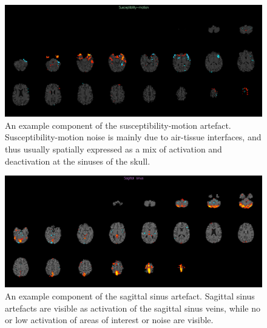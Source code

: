 \begin{figure}[H]                 
	\includegraphics[width=.85\textwidth]{figures/bMethods/Susceptibility_motion}  
	\caption{An example component of the susceptibility-motion artefact. Susceptibility-motion noise is mainly due to air-tissue interfaces, and thus usually spatially expressed as a mix of activation and deactivation at the sinuses of the skull.}
	\label{fig:meth:sus} 
\end{figure}

\begin{figure}[H]                 
	\includegraphics[width=.85\textwidth]{figures/bMethods/sag_sinus}  
	\caption{An example component of the sagittal sinus artefact. Sagittal sinus artefacts are visible as activation of the sagittal sinus veins, while no or low activation of areas of interest or noise are visible.}
	\label{fig:meth:sinus} 
\end{figure}


